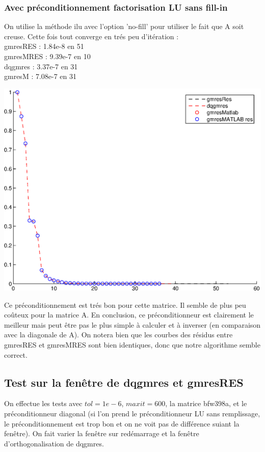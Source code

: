 \subsubsection*{Avec préconditionnement factorisation LU sans fill-in}
On utilise la méthode ilu avec l'option 'no-fill' pour utiliser le fait que A soit creuse. Cette fois tout converge en trés peu d'itération :\\
gmresRES : 1.84e-8 en 51\\
gmresMRES : 9.39e-7 en 10\\
dqgmres : 3.37e-7 en 31\\
gmresM : 7.08e-7 en 31\\
\begin{center}
\includegraphics[scale=0.65]{lu.eps}
\end{center}
Ce préconditionnement est trés bon pour cette matrice. Il semble de plus peu coûteux pour la matrice A. En conclusion, ce préconditionneur est clairement le meilleur mais peut être pas le plus simple à calculer et à inverser (en comparaison avec la diagonale de A). On notera bien que les courbes des résidus entre gmresRES et gmresMRES sont bien identiques, donc que notre algorithme semble correct.
\newpage
\subsection{Test sur la fenêtre de dqgmres et gmresRES}
On effectue les tests avec $tol = 1e-6$, $maxit=600$, la matrice bfw398a, et le préconditionneur diagonal (si l'on prend le préconditionneur LU sans remplissage, le préconditionnement est trop bon et on ne voit pas de différence suiant la fenêtre). On fait varier la fenêtre sur redémarrage et la fenêtre d'orthogonalisation de dqgmres.
